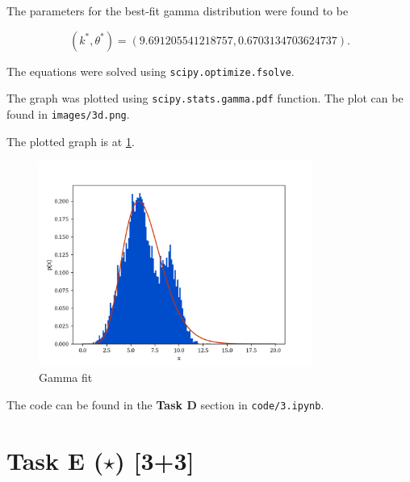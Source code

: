 The parameters for the best-fit gamma distribution were found to be

\begin{equation*}
    (k^*, \theta^*) = (9.691205541218757, 0.6703134703624737).
\end{equation*}

The equations were solved using \texttt{scipy.optimize.fsolve}.

The graph was plotted using \texttt{scipy.stats.gamma.pdf} function. The plot can
be found in \texttt{images/3d.png}.

The plotted graph is at \ref{fig_a3d}.

\begin{figure}[H]
    \centering
    \includegraphics[width=0.8\textwidth]{assets/images/a3d.png}
    \caption{Gamma fit}
    \label{fig_a3d}
\end{figure}

The code can be found in the \textbf{Task D} section in \texttt{code/3.ipynb}.

\section*{\colS{$\S$} Task E ($\star$) \hfill \normalfont \large [3+3]}

